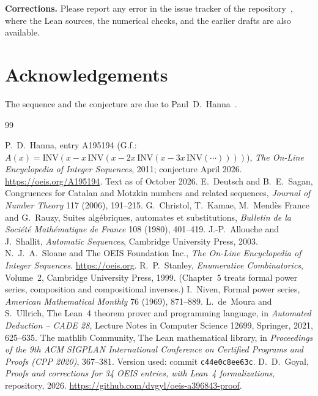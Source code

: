 \documentclass[11pt,a4paper]{article}
\theoremstyle{definition}
\theoremstyle{remark}
\newcommand{\para}[1]{\par\medskip\noindent\textbf{#1}\enspace}
\begin{document}
\para{Corrections.} Please report any error in the issue tracker of the repository~\cite{repo}, where the Lean
sources, the numerical checks, and the earlier drafts are also available.

\section*{Acknowledgements}
The sequence and the conjecture are due to Paul~D.~Hanna~\cite{oeis}.

\begin{thebibliography}{99}\small
\raggedright
{} P.~D.~Hanna, entry A195194 (G.f.: $A(x)=\mathrm{INV}(x-x\,\mathrm{INV}(x-2x\,\mathrm{INV}(x-3x\,\mathrm{INV}(\cdots))))$), \emph{The On-Line Encyclopedia of Integer Sequences}, 2011; conjecture April 2026. \url{https://oeis.org/A195194}. Text as of October 2026.
 E.~Deutsch and B.~E.~Sagan, Congruences for Catalan and Motzkin numbers and related sequences, \emph{Journal of Number Theory} 117 (2006), 191--215.
 G.~Christol, T.~Kamae, M.~Mend\`es France and G.~Rauzy, Suites alg\'ebriques, automates et substitutions, \emph{Bulletin de la Soci\'et\'e Math\'ematique de France} 108 (1980), 401--419.
 J.-P.~Allouche and J.~Shallit, \emph{Automatic Sequences}, Cambridge University Press, 2003.
 N.~J.~A.~Sloane and The OEIS Foundation Inc., \emph{The On-Line Encyclopedia of Integer Sequences}. \url{https://oeis.org}.
 R.~P.~Stanley, \emph{Enumerative Combinatorics}, Volume~2, Cambridge University Press, 1999. (Chapter~5 treats formal power series, composition and compositional inverses.)
 I.~Niven, Formal power series, \emph{American Mathematical Monthly} 76 (1969), 871--889.
 L.~de~Moura and S.~Ullrich, The Lean~4 theorem prover and programming language, in \emph{Automated Deduction -- CADE 28}, Lecture Notes in Computer Science 12699, Springer, 2021, 625--635.
 The mathlib Community, The Lean mathematical library, in \emph{Proceedings of the 9th ACM SIGPLAN International Conference on Certified Programs and Proofs (CPP 2020)}, 367--381. Version used: commit \texttt{c44e0c8ee63c}.
 D.~D.~Goyal, \emph{Proofs and corrections for 34 OEIS entries, with Lean~4 formalizations}, repository, 2026. \url{https://github.com/dvgyl/oeis-a396843-proof}.
\end{thebibliography}
\end{document}
